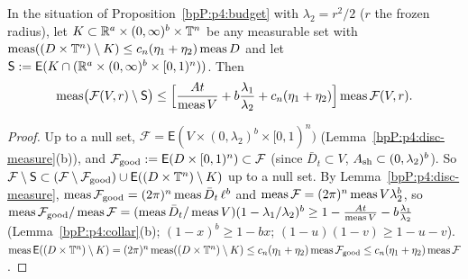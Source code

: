 \begin{proposition}\label{bpP:p4:cell-budget}
In the situation of Proposition~\ref{bpP:p4:budget} with $\lambda_2=r^2/2$ ($r$ the frozen radius), let $K\subset\mathbb{R}^a\times(0,\infty)^b\times\mathbb{T}^n$ be any measurable set with $\operatorname{meas}((D\times\mathbb{T}^n)\setminus K)\le c_n(\eta_1+\eta_2)\operatorname{meas} D$ and let $\mathsf S:=\mathsf E(K\cap(\mathbb{R}^a\times(0,\infty)^b\times[0,1)^n))$. Then
\[\operatorname{meas}\bigl(\mathcal F(V,r)\setminus\mathsf S\bigr)\le\Bigl[\frac{At}{\operatorname{meas} V}+b\frac{\lambda_1}{\lambda_2}+c_n(\eta_1+\eta_2)\Bigr]\operatorname{meas}\mathcal F(V,r).\]
\end{proposition}
\begin{proof}
\label{stepP:p4:cb-dec}
Up to a null set, $\mathcal F=\mathsf E(V\times(0,\lambda_2)^b\times[0,1)^n)$ (Lemma~\ref{bpP:p4:disc-measure}(b)), and $\mathcal F_{\rm good}:=\mathsf E(D\times[0,1)^n)\subset\mathcal F$ (since $\bar D_t\subset V$, $A_{\rm sh}\subset(0,\lambda_2)^b$). So $\mathcal F\setminus\mathsf S\subset(\mathcal F\setminus\mathcal F_{\rm good})\cup\mathsf E((D\times\mathbb{T}^n)\setminus K)$ up to a null set.
\label{stepP:p4:cb-bad}
By Lemma~\ref{bpP:p4:disc-measure}, $\operatorname{meas}\mathcal F_{\rm good}=(2\pi)^n\operatorname{meas}\bar D_t\,\ell^b$ and $\operatorname{meas}\mathcal F=(2\pi)^n\operatorname{meas} V\lambda_2^b$, so
$\operatorname{meas}\mathcal F_{\rm good}/\operatorname{meas}\mathcal F=(\operatorname{meas}\bar D_t/\operatorname{meas} V)(1-\lambda_1/\lambda_2)^b\ge1-\frac{At}{\operatorname{meas} V}-b\frac{\lambda_1}{\lambda_2}$ (Lemma~\ref{bpP:p4:collar}(b); $(1-x)^b\ge1-bx$; $(1-u)(1-v)\ge1-u-v$).
\label{stepP:p4:cb-lost}
$\operatorname{meas}\mathsf E((D\times\mathbb{T}^n)\setminus K)=(2\pi)^n\operatorname{meas}((D\times\mathbb{T}^n)\setminus K)\le c_n(\eta_1+\eta_2)\operatorname{meas}\mathcal F_{\rm good}\le c_n(\eta_1+\eta_2)\operatorname{meas}\mathcal F$.
\end{proof}

